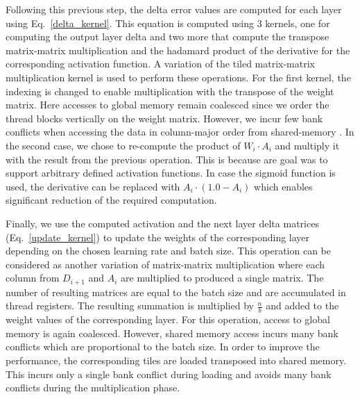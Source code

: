 Following this previous step, the delta error values are computed for each layer using Eq.~\ref{delta_kernel}. This equation is computed using 3 kernels, one for computing the output layer delta and two more that compute the transpose matrix-matrix multiplication and the hadamard product of the derivative for the corresponding activation function. A variation of the tiled matrix-matrix multiplication kernel is used to perform these operations. For the first kernel, the indexing is changed to enable multiplication with the transpose of the weight matrix. Here accesses to global memory remain coalesced since we order the thread blocks vertically on the weight matrix. However, we incur few bank conflicts when accessing the data in column-major order from shared-memory . In the second case, we chose to re-compute the product of $W_i \cdot A_i$ and multiply it with the result from the previous operation. This is because are goal was to support arbitrary defined activation functions. In case the sigmoid function is used, the derivative can be replaced with $A_i \cdot \left(1.0 - A_i\right)$ which enables significant reduction of the required computation.

Finally, we use the computed activation and the next layer delta matrices (Eq.~\ref{update_kernel}) to update the weights of the corresponding layer depending on the chosen learning rate and batch size. This operation can be considered as another variation of matrix-matrix multiplication where each column from $ D_{i+1}$ and $A_{i}$ are  multiplied to produced a single matrix. The number of resulting matrices are equal to the batch size and are accumulated in thread registers. The resulting summation is multiplied by $\frac{n}{b}$ and added to the weight values of the corresponding layer. For this operation, access to global memory is again coalesced. However, shared memory access incurs many bank conflicts which are proportional to the batch size. In order to improve the performance, the corresponding tiles are loaded transposed into shared memory. This incurs only a single bank conflict during loading and avoids many bank conflicts during the multiplication phase.
